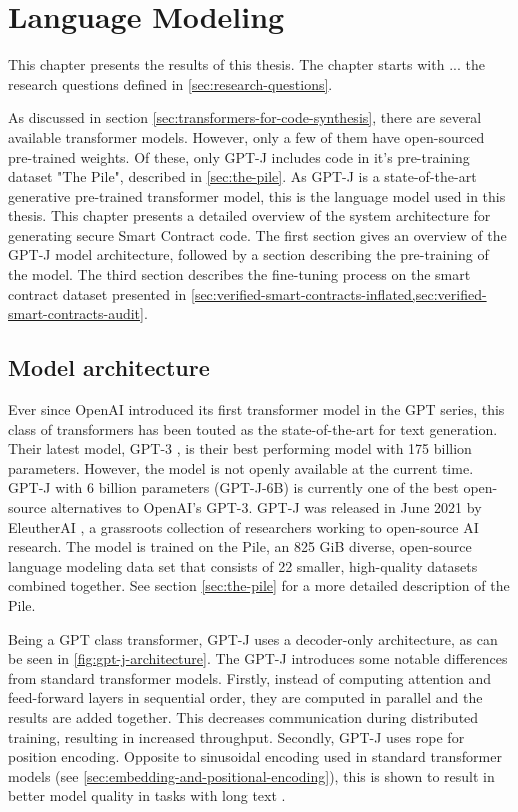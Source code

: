 \chapter{Language Modeling}
\label{chap:architecture}
This chapter presents the results of this thesis. The chapter starts with ... the research questions defined in \cref{sec:research-questions}.

As discussed in section \cref{sec:transformers-for-code-synthesis}, there are several available transformer models. However, only a few of them have open-sourced pre-trained weights. Of these, only GPT-J \cite{gpt-j} includes code in it's pre-training dataset "The Pile", described in \cref{sec:the-pile}. As GPT-J is a state-of-the-art generative pre-trained transformer model, this is the language model used in this thesis. This chapter presents a detailed overview of the system architecture for generating secure Smart Contract code. The first section gives an overview of the GPT-J model architecture, followed by a section describing the pre-training of the model. The third section describes the fine-tuning process on the smart contract dataset presented in \cref{sec:verified-smart-contracts-inflated,sec:verified-smart-contracts-audit}. 


\section{Model architecture}
\label{sec:architecture}
Ever since OpenAI introduced its first transformer model in the GPT series, this class of transformers has been touted as the state-of-the-art for text generation. Their latest model, GPT-3 \cite{brown2020language}, is their best performing model with 175 billion parameters. However, the model is not openly available at the current time. GPT-J \cite{gpt-j} with 6 billion parameters (GPT-J-6B) is currently one of the best open-source alternatives to OpenAI's GPT-3. GPT-J was released in June 2021 by EleutherAI \cite{elutherai}, a grassroots collection of researchers working to open-source AI research. The model is trained on the Pile, an 825 GiB diverse, open-source language modeling data set that consists of 22 smaller, high-quality datasets combined together. See section \cref{sec:the-pile} for a more detailed description of the Pile.

Being a GPT class transformer, GPT-J uses a decoder-only architecture, as can be seen in \cref{fig:gpt-j-architecture}. The GPT-J introduces some notable differences from standard transformer models. Firstly, instead of computing attention and feed-forward layers in sequential order, they are computed in parallel and the results are added together. This decreases communication during distributed training, resulting in increased throughput. Secondly, GPT-J uses \acrfull{rope} \cite{su2021roformer} for position encoding. Opposite to sinusoidal encoding used in standard transformer models (see \cref{sec:embedding-and-positional-encoding}), this is shown to result in better model quality in tasks with long text \cite{su2021roformer}.

